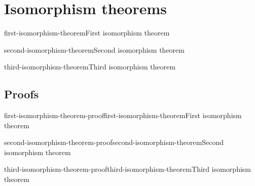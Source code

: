 \documentclass[preview]{standalone}
\begin{document}
\genpage

\section{Isomorphism theorems}


\begin{snippettheorem}{first-isomorphism-theorem}{First isomorphism theorem}
    \todo
\end{snippettheorem}

\begin{snippettheorem}{second-isomorphism-theorem}{Second isomorphism theorem}
    \todo
\end{snippettheorem}

\begin{snippettheorem}{third-isomorphism-theorem}{Third isomorphism theorem}
    \todo
\end{snippettheorem}

\subsection{Proofs}

\begin{snippetproof}{first-isomorphism-theorem-proof}{first-isomorphism-theorem}{First isomorphism theorem}
    \todo
\end{snippetproof}

\begin{snippetproof}{second-isomorphism-theorem-proof}{second-isomorphism-theorem}{Second isomorphism theorem}
    \todo
\end{snippetproof}

\begin{snippetproof}{third-isomorphism-theorem-proof}{third-isomorphism-theorem}{Third isomorphism theorem}
    \todo
\end{snippetproof}
\end{document}
